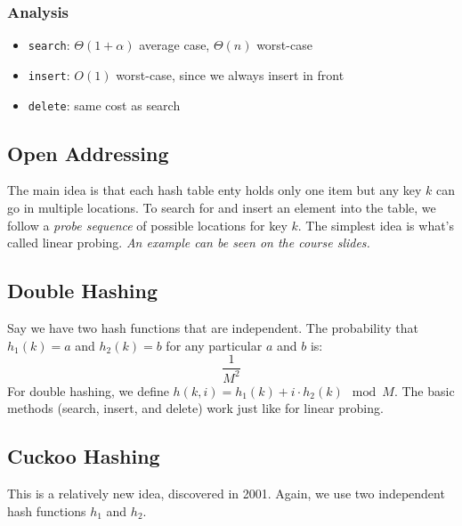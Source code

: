 \documentclass{report}
\begin{document}
\subsubsection{Analysis}
\begin{itemize}
\item \texttt{search}: $\Theta(1 + \alpha)$ average case, $\Theta(n)$ worst-case
\item \texttt{insert}: $O(1)$ worst-case, since we always insert in front
\item \texttt{delete}: same cost as search
\end{itemize}
\subsection{Open Addressing}
The main idea is that each hash table enty holds only one item but any key $k$ can go in multiple locations. To search for and insert an element into the table, we follow a \textit{probe sequence} of possible locations for key $k$. The simplest idea is what's called linear probing. \textit{An example can be seen on the course slides.}
\subsection{Double Hashing}
Say we have two hash functions that are independent. The probability that $h_1(k) = a$ and $h_2(k) = b$ for any particular $a$ and $b$ is:
$$\frac{1}{M^2}$$
For double hashing, we define $h(k,i) = h_1(k) + i \cdot h_2(k) \mod M$. The basic methods (search, insert, and delete) work just like for linear probing.
\subsection{Cuckoo Hashing}
This is a relatively new idea, discovered in 2001. Again, we use two independent hash functions $h_1$ and $h_2$.
\end{document}
